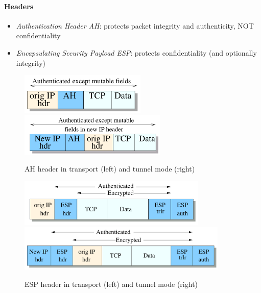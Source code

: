 \paragraph{Headers}

\begin{itemize}
    \item \emph{Authentication Header AH}: protects packet integrity and authenticity, NOT confidentiality
    \item \emph{Encapsulating Security Payload ESP}: protects confidentiality (and optionally integrity)
\end{itemize}


\begin{figure}[h]
    \centering
    \includegraphics[width=6cm]{images/ch9-ipsec-ah-transport.png}
    \hspace{1cm}
    \includegraphics[width=7cm]{images/ch9-ipsec-ah-tunnel.png}
    \caption{AH header in transport (left) and tunnel mode (right)}
    \label{fig:ipsec-ah}
\end{figure}

\begin{figure}[h]
    \centering
    \addtolength{\leftskip}{-2cm}
    \addtolength{\rightskip}{-2cm}
    \includegraphics[width=9cm]{images/ch9-ipsec-esp-transport.png}
    \hspace{0.5cm}
    \includegraphics[width=10cm]{images/ch9-ipsec-esp-tunnel.png}
    \caption{ESP header in transport (left) and tunnel mode (right)}
    \label{fig:ipsec-esp}
\end{figure}

